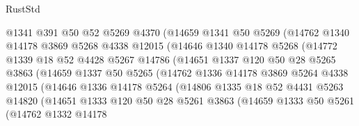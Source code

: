 \begin{lexlean}{RustStd}
\begin{coremodule}
                    @1341
                    @391
                    @50
                    @52
                    @5269
                    @4370
                    (@14659
                      @1341
                      @50
                      @5269
                      (@14762
                        @1340
                        @14178
                        @3869
                        @5268
                        @4338
                        @12015
                        (@14646
                          @1340
                          @14178
                          @5268
                          (@14772
                            @1339
                            @18
                            @52
                            @4428
                            @5267
                            @14786
                            (@14651
                              @1337
                              @120
                              @50
                              @28
                              @5265
                              @3863
                              (@14659
                                @1337
                                @50
                                @5265
                                (@14762
                                  @1336
                                  @14178
                                  @3869
                                  @5264
                                  @4338
                                  @12015
                                  (@14646
                                    @1336
                                    @14178
                                    @5264
                                    (@14806
                                      @1335
                                      @18
                                      @52
                                      @4431
                                      @5263
                                      @14820
                                      (@14651
                                        @1333
                                        @120
                                        @50
                                        @28
                                        @5261
                                        @3863
                                        (@14659
                                          @1333
                                          @50
                                          @5261
                                          (@14762
                                            @1332
                                            @14178

\end{coremodule}
\end{lexlean}
